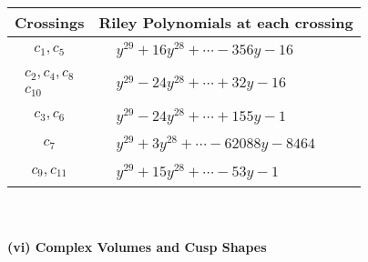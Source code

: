 \documentclass[1p]{elsarticle_modified}
\theoremstyle{definition}
\begin{document}
\begin{tabular}{m{50pt}|m{274pt}}
Crossings & \hspace{64pt}Riley Polynomials at each crossing \\
\hline $$\begin{aligned}c_{1},c_{5}\end{aligned}$$&$\begin{aligned}
&y^{29}+16 y^{28}+\cdots-356 y-16
\end{aligned}$\\
\hline $$\begin{aligned}c_{2},c_{4},c_{8}\\c_{10}\end{aligned}$$&$\begin{aligned}
&y^{29}-24 y^{28}+\cdots+32 y-16
\end{aligned}$\\
\hline $$\begin{aligned}c_{3},c_{6}\end{aligned}$$&$\begin{aligned}
&y^{29}-24 y^{28}+\cdots+155 y-1
\end{aligned}$\\
\hline $$\begin{aligned}c_{7}\end{aligned}$$&$\begin{aligned}
&y^{29}+3 y^{28}+\cdots-62088 y-8464
\end{aligned}$\\
\hline $$\begin{aligned}c_{9},c_{11}\end{aligned}$$&$\begin{aligned}
&y^{29}+15 y^{28}+\cdots-53 y-1
\end{aligned}$\\
\hline
\end{tabular}\\~\\
\newpage\flushleft \textbf{(vi) Complex Volumes and Cusp Shapes}
\end{document}
